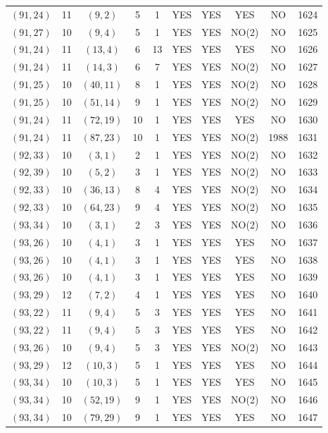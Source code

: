 \begin{longtable}{|c|c|c|c|c|c|c|c|c|c|}
$(91, 24)$ & 11 & $(9, 2)$ & 5 & 1 & YES & YES & YES & NO & 1624\\
$(91, 27)$ & 10 & $(9, 4)$ & 5 & 1 & YES & YES & NO(2) & NO & 1625\\
$(91, 24)$ & 11 & $(13, 4)$ & 6 & 13 & YES & YES & YES & NO & 1626\\
$(91, 24)$ & 11 & $(14, 3)$ & 6 & 7 & YES & YES & NO(2) & NO & 1627\\
$(91, 25)$ & 10 & $(40, 11)$ & 8 & 1 & YES & YES & NO(2) & NO & 1628\\
$(91, 25)$ & 10 & $(51, 14)$ & 9 & 1 & YES & YES & NO(2) & NO & 1629\\
$(91, 24)$ & 11 & $(72, 19)$ & 10 & 1 & YES & YES & YES & NO & 1630\\
$(91, 24)$ & 11 & $(87, 23)$ & 10 & 1 & YES & YES & NO(2) & 1988 & 1631\\
$(92, 33)$ & 10 & $(3, 1)$ & 2 & 1 & YES & YES & NO(2) & NO & 1632\\
$(92, 39)$ & 10 & $(5, 2)$ & 3 & 1 & YES & YES & NO(2) & NO & 1633\\
$(92, 33)$ & 10 & $(36, 13)$ & 8 & 4 & YES & YES & NO(2) & NO & 1634\\
$(92, 33)$ & 10 & $(64, 23)$ & 9 & 4 & YES & YES & NO(2) & NO & 1635\\
$(93, 34)$ & 10 & $(3, 1)$ & 2 & 3 & YES & YES & NO(2) & NO & 1636\\
$(93, 26)$ & 10 & $(4, 1)$ & 3 & 1 & YES & YES & YES & NO & 1637\\
$(93, 26)$ & 10 & $(4, 1)$ & 3 & 1 & YES & YES & YES & NO & 1638\\
$(93, 26)$ & 10 & $(4, 1)$ & 3 & 1 & YES & YES & YES & NO & 1639\\
$(93, 29)$ & 12 & $(7, 2)$ & 4 & 1 & YES & YES & YES & NO & 1640\\
$(93, 22)$ & 11 & $(9, 4)$ & 5 & 3 & YES & YES & YES & NO & 1641\\
$(93, 22)$ & 11 & $(9, 4)$ & 5 & 3 & YES & YES & YES & NO & 1642\\
$(93, 26)$ & 10 & $(9, 4)$ & 5 & 3 & YES & YES & NO(2) & NO & 1643\\
$(93, 29)$ & 12 & $(10, 3)$ & 5 & 1 & YES & YES & YES & NO & 1644\\
$(93, 34)$ & 10 & $(10, 3)$ & 5 & 1 & YES & YES & YES & NO & 1645\\
$(93, 34)$ & 10 & $(52, 19)$ & 9 & 1 & YES & YES & NO(2) & NO & 1646\\
$(93, 34)$ & 10 & $(79, 29)$ & 9 & 1 & YES & YES & YES & NO & 1647\\

\end{longtable}
